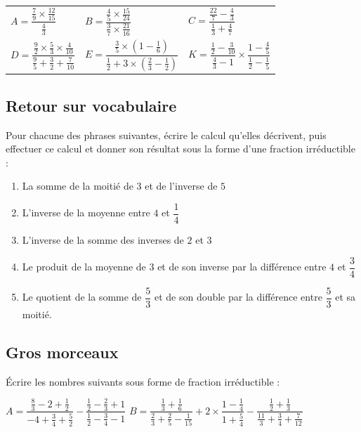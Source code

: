 \documentclass[oneside,12pt]{article}          %
\begin{document}
\renewcommand{\arraystretch}{2.75}
\begin{tabular}{p{} p{} p{} }
	$A = \dfrac{\frac{7}{9} \times \frac{12}{15}}{\frac{4}{3}}$ &
	$B = \dfrac{\frac{4}{5} \times \frac{15}{24}}{\frac{3}{7} \times \frac{21}{16}}$ &
	$C = \dfrac{\frac{22}{7} - \frac{4}{3}}{\frac{1}{3} + \frac{4}{7}}$ \\
	$D = \dfrac{\frac{9}{2} \times \frac{5}{3} \times \frac{4}{10}}{\frac{9}{5} + \frac{3}{2} + \frac{7}{10}}$  &
	$E = \dfrac{\frac{3}{5} \times \left( 1 - \frac{1}{6} \right)}{\frac{1}{2} + 3 \times \left( \frac{2}{3} - \frac{1}{2} \right) } $ &
	$K = \dfrac{\frac{1}{2}-\frac{3}{10}}{\frac{4}{3}-1}\times\dfrac{1-\frac{4}{5}}{\frac{1}{2}-\frac{1}{5}}$ 
\end{tabular}



\subsection{Retour sur vocabulaire}
Pour chacune des phrases suivantes, écrire le calcul qu'elles décrivent, puis effectuer ce calcul et donner son résultat sous la forme d'une fraction irréductible :
\begin{enumerate}
	\item La somme de la moitié de $3$ et de l'inverse de $5$
	\item L'inverse de la moyenne entre $4$ et $\dfrac{1}{4}$
	\item L'inverse de la somme des inverses de $2$ et $3$
	\item Le produit de la moyenne de $3$ et de son inverse par la différence entre $4$ et $\dfrac{3}{4}$
	\item Le quotient de la somme de $\dfrac{5}{3}$ et de son double par la différence entre $\dfrac{5}{3}$ et sa moitié.
\end{enumerate}



\subsection{Gros morceaux}
Écrire les nombres suivants sous forme de fraction irréductible :

    $A = \dfrac{\frac{8}{3}-2+\frac{1}{2}}{-4+\frac{3}{4}+\frac{5}{2}}-\dfrac{\frac{1}{2}-\frac{2}{3}+1}{\frac{1}{2}-\frac{3}{4}-1}$ \hspace{4cm}
    $B = \dfrac{\frac{1}{3}+\frac{1}{6}}{\frac{2}{3}+\frac{2}{5}-\frac{1}{15}}+2\times\dfrac{1-\frac{1}{4}}{1+\frac{5}{4}}-\dfrac{\frac{1}{2}+\frac{1}{3}}{\frac{11}{3}+\frac{3}{4}+\frac{7}{12}}$
    
\end{document}
